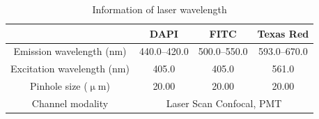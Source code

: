 \begin{table}[H]
	\centering
	\caption{Information of laser wavelength}
	\label{tab:レーザー波長}
	\begin{tabular}{cccc}\toprule
		& DAPI & FITC & Texas Red \\ \midrule
		Emission wavelength (nm) & 440.0--420.0 & 500.0--550.0 & 593.0--670.0 \\ 
		Excitation wavelength (nm) & 405.0 & 405.0 & 561.0 \\ 
		Pinhole size ($\upmu$m) & 20.00 & 20.00 & 20.00 \\ 
		Channel modality & \multicolumn{3}{c}{Laser Scan Confocal, PMT } \\ \bottomrule
	\end{tabular}
\end{table}





